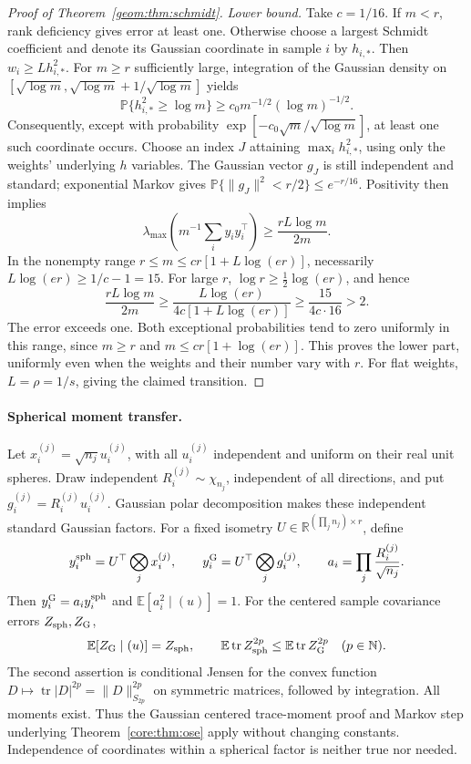 \documentclass[11pt,a4paper]{article}
\theoremstyle{definition}\newtheorem{definition}[theorem]{Definition}
\theoremstyle{remark}\newtheorem{remark}[theorem]{Remark}
\numberwithin{equation}{section}
\newcommand{\R}{\mathbb R}\newcommand{\E}{\mathbb E}\newcommand{\Pp}{\mathbb P}
\newcommand{\norm}[1]{\lVert#1\rVert}\newcommand{\ip}[2]{\langle#1,#2\rangle}
\DeclareMathOperator{\tr}{tr}\DeclareMathOperator{\rank}{rank}
\begin{document}
\begin{proof}[Proof of Theorem~\ref{geom:thm:schmidt}]
\emph{Lower bound.}
Take $c=1/16$. If $m<r$, rank deficiency gives error at least one.
Otherwise choose a largest Schmidt coefficient and denote its Gaussian
coordinate in sample $i$ by $h_{i,*}$. Then $w_i\ge Lh_{i,*}^2$.
For $m\ge r$ sufficiently large, integration of the Gaussian density on
$[\sqrt{\log m},\sqrt{\log m}+1/\sqrt{\log m}]$ yields
\[
 \Pp\{h_{i,*}^2\ge\log m\}\ge
       c_0m^{-1/2}(\log m)^{-1/2}.
\]
Consequently, except with probability
$\exp[-c_0\sqrt m/\sqrt{\log m}]$, at least one such coordinate occurs.
Choose an index $J$ attaining $\max_ih_{i,*}^2$, using only the weights'
underlying $h$ variables. The Gaussian vector $g_J$ is still independent
and standard; exponential Markov gives
$\Pp\{\norm{g_J}^2<r/2\}\le e^{-r/16}$. Positivity then implies
\[
 \lambda_{\max}\left(m^{-1}\sum_i y_iy_i^\top\right)
 \ge\frac{rL\log m}{2m}.
\]
In the nonempty range $r\le m\le cr[1+L\log(er)]$, necessarily
$L\log(er)\ge1/c-1=15$. For large $r$,
$\log r\ge\tfrac12\log(er)$, and hence
\[
 \frac{rL\log m}{2m}
 \ge\frac{L\log(er)}{4c[1+L\log(er)]}
 \ge\frac{15}{4c\cdot16}>2.
\]
The error exceeds one. Both exceptional probabilities tend to zero
uniformly in this range, since $m\ge r$ and
$m\le cr[1+\log(er)]$. This proves the lower part, uniformly even when
the weights and their number vary with $r$. For flat weights,
$L=\rho=1/s$, giving the claimed transition.
\end{proof}

\paragraph{Spherical moment transfer.}
\label{proof:spherical-transfer}
Let $x_i^{(j)}=\sqrt{n_j}u_i^{(j)}$, with all $u_i^{(j)}$ independent
and uniform on their real unit spheres. Draw independent
$R_i^{(j)}\sim\chi_{n_j}$, independent of all directions, and put
$g_i^{(j)}=R_i^{(j)}u_i^{(j)}$. Gaussian polar decomposition makes these
independent standard Gaussian factors. For a fixed isometry
$U\in\R^{(\prod_jn_j)\times r}$, define
\[
 y_i^{\rm sph}=U^\top\bigotimes_j x_i^{(j)},\qquad
 y_i^{\rm G}=U^\top\bigotimes_j g_i^{(j)},\qquad
 a_i=\prod_j\frac{R_i^{(j)}}{\sqrt{n_j}}.
\]
Then $y_i^{\rm G}=a_iy_i^{\rm sph}$ and $\E[a_i^2\mid(u)]=1$.
For the centered sample covariance errors $Z_{\rm sph},Z_{\rm G}$,
\begin{equation}\label{geom:eq:conditional-jensen}
 \E[Z_{\rm G}\mid(u)]=Z_{\rm sph},\qquad
 \E\tr Z_{\rm sph}^{2p}\le\E\tr Z_{\rm G}^{2p}
 \quad(p\in\mathbb N).
\end{equation}
The second assertion is conditional Jensen for the convex function
$D\mapsto\tr|D|^{2p}=\norm D_{S_{2p}}^{2p}$ on symmetric matrices,
followed by integration. All moments exist. Thus the Gaussian centered
trace-moment proof and Markov step underlying
Theorem~\ref{core:thm:ose} apply without changing constants. Independence
of coordinates within a spherical factor is neither true nor needed.
\end{document}
